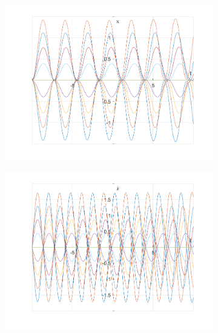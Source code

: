 \documentclass{article}
\begin{document}
	\begin{figure}[h!]
		\centering
		\begin{subfigure}[b]{0.48\linewidth}
			\includegraphics[width=\linewidth]{./SmallOscillations/S10/F3.png}
		\end{subfigure}
		\begin{subfigure}[b]{0.48\linewidth}
			\includegraphics[width=\linewidth]{./SmallOscillations/S10/F4.png}
		\end{subfigure}
	\end{figure}
\end{document}
